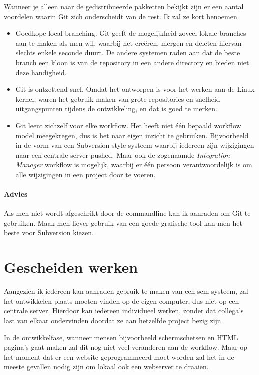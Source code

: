 Wanneer je alleen naar de gedistribueerde pakketten bekijkt zijn er een aantal voordelen waarin Git zich onderscheidt van de rest. Ik zal ze kort benoemen.

\begin{itemize}
  \item Goedkope local branching. Git geeft de mogelijkheid zoveel lokale branches aan te maken als men wil, waarbij het creëren, mergen en deleten hiervan slechts enkele seconde duurt. De andere systemen raden aan dat de beste branch een kloon is van de repository in een andere directory en bieden niet deze handigheid.
  \item Git is ontzettend snel\cite{whygitisbetterthanx}. Omdat het ontworpen is voor het werken aan de Linux kernel, waren het gebruik maken van grote repositories en snelheid uitgangspunten tijdens de ontwikkeling, en dat is goed te merken.
  \item Git leent zichzelf voor elke workflow. Het heeft niet één bepaald workflow model meegekregen, dus is het naar eigen inzicht te gebruiken. Bijvoorbeeld in de vorm van een Subversion-style systeem waarbij iedereen zijn wijzigingen naar een centrale server pushed. Maar ook de zogenaamde \emph{Integration Manager} workflow is mogelijk, waarbij er één persoon verantwoordelijk is om alle wijzigingen in een project door te voeren.
\end{itemize}

\paragraph{Advies} Als men niet wordt afgeschrikt door de commandline kan ik aanraden om Git te gebruiken. Maak men liever gebruik van een goede grafische tool kan men het beste voor Subversion kiezen.

\section{Gescheiden werken}

Aangezien ik iedereen kan aanraden gebruik te maken van een {\sc scm} systeem, zal het ontwikkelen plaats moeten vinden op de eigen computer, dus niet op een centrale server. Hierdoor kan iedereen individueel werken, zonder dat collega's last van elkaar ondervinden doordat ze aan hetzelfde project bezig zijn.

In de ontwikkelfase, wanneer mensen bijvoorbeeld schermschetsen en HTML pagina's gaat maken zal dit nog niet veel veranderen aan de workflow. Maar op het moment dat er een website geprogrammeerd moet worden zal het in de meeste gevallen nodig zijn om lokaal ook een webserver te draaien. 

